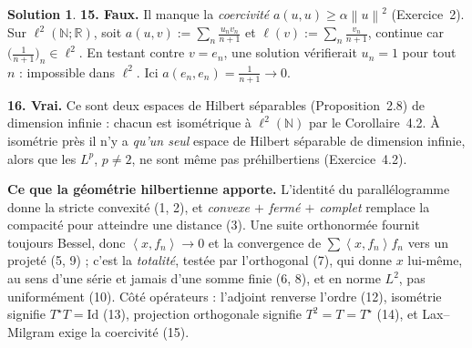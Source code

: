 \documentclass[11pt,a4paper]{article}
\newcommand{\R}{\mathbb{R}}
\newcommand{\N}{\mathbb{N}}
\newcommand{\norm}[1]{\left\|#1\right\|}
\newcommand{\ps}[2]{\left\langle #1,#2\right\rangle}
\theoremstyle{definition}
\newtheorem*{solution}{Solution}
\begin{document}
\begin{solution}
\medskip
\noindent\textbf{15. Faux.} Il manque la \emph{coercivité} $a(u,u)\ge\alpha\norm u^2$ (Exercice~2). Sur $\ell^2(\N;\R)$, soit $a(u,v):=\sum_n\frac{u_nv_n}{n+1}$ et $\ell(v):=\sum_n\frac{v_n}{n+1}$, continue car $\big(\frac1{n+1}\big)_n\in\ell^2$. En testant contre $v=e_n$, une solution vérifierait $u_n=1$ pour tout $n$ : impossible dans $\ell^2$. Ici $a(e_n,e_n)=\frac1{n+1}\to0$.

\medskip
\noindent\textbf{16. Vrai.} Ce sont deux espaces de Hilbert séparables (Proposition~2.8) de dimension infinie : chacun est isométrique à $\ell^2(\N)$ par le Corollaire~4.2. À isométrie près il n'y a \emph{qu'un seul} espace de Hilbert séparable de dimension infinie, alors que les $L^p$, $p\ne2$, ne sont même pas préhilbertiens (Exercice~4.2).
\end{solution}

\begin{pointcle}
\textbf{Ce que la géométrie hilbertienne apporte.} L'identité du parallélogramme donne la stricte convexité (1, 2), et \emph{convexe $+$ fermé $+$ complet} remplace la compacité pour atteindre une distance (3). Une suite orthonormée fournit toujours Bessel, donc $\ps x{f_n}\to0$ et la convergence de $\sum\ps x{f_n}f_n$ vers un projeté (5, 9) ; c'est la \emph{totalité}, testée par l'orthogonal (7), qui donne $x$ lui-même, au sens d'une série et jamais d'une somme finie (6, 8), et en norme $L^2$, pas uniformément (10). Côté opérateurs : l'adjoint renverse l'ordre (12), isométrie signifie $T^\star T=\mathrm{Id}$ (13), projection orthogonale signifie $T^2=T=T^\star$ (14), et Lax--Milgram exige la coercivité (15).
\end{pointcle}
\end{document}
